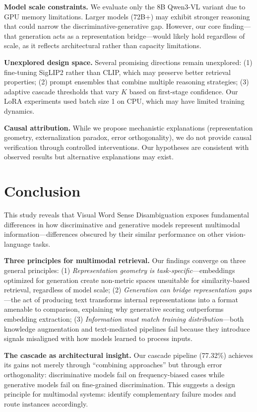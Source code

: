 \documentclass[11pt]{article}
\begin{document}
\textbf{Model scale constraints.} We evaluate only the 8B Qwen3-VL variant due to GPU memory limitations. Larger models (72B+) may exhibit stronger reasoning that could narrow the discriminative-generative gap. However, our core finding---that generation acts as a representation bridge---would likely hold regardless of scale, as it reflects architectural rather than capacity limitations.

\textbf{Unexplored design space.} Several promising directions remain unexplored: (1) fine-tuning SigLIP2 rather than CLIP, which may preserve better retrieval properties; (2) prompt ensembles that combine multiple reasoning strategies; (3) adaptive cascade thresholds that vary $K$ based on first-stage confidence. Our LoRA experiments used batch size 1 on CPU, which may have limited training dynamics.

\textbf{Causal attribution.} While we propose mechanistic explanations (representation geometry, externalization paradox, error orthogonality), we do not provide causal verification through controlled interventions. Our hypotheses are consistent with observed results but alternative explanations may exist.

\section{Conclusion}
\label{sec:conclusion}

This study reveals that Visual Word Sense Disambiguation exposes fundamental differences in how discriminative and generative models represent multimodal information---differences obscured by their similar performance on other vision-language tasks.

\textbf{Three principles for multimodal retrieval.} Our findings converge on three general principles: (1) \textit{Representation geometry is task-specific}---embeddings optimized for generation create non-metric spaces unsuitable for similarity-based retrieval, regardless of model scale; (2) \textit{Generation can bridge representation gaps}---the act of producing text transforms internal representations into a format amenable to comparison, explaining why generative scoring outperforms embedding extraction; (3) \textit{Information must match training distribution}---both knowledge augmentation and text-mediated pipelines fail because they introduce signals misaligned with how models learned to process inputs.

\textbf{The cascade as architectural insight.} Our cascade pipeline (77.32\%) achieves its gains not merely through ``combining approaches'' but through error orthogonality: discriminative models fail on frequency-biased cases while generative models fail on fine-grained discrimination. This suggests a design principle for multimodal systems: identify complementary failure modes and route instances accordingly.
\end{document}
